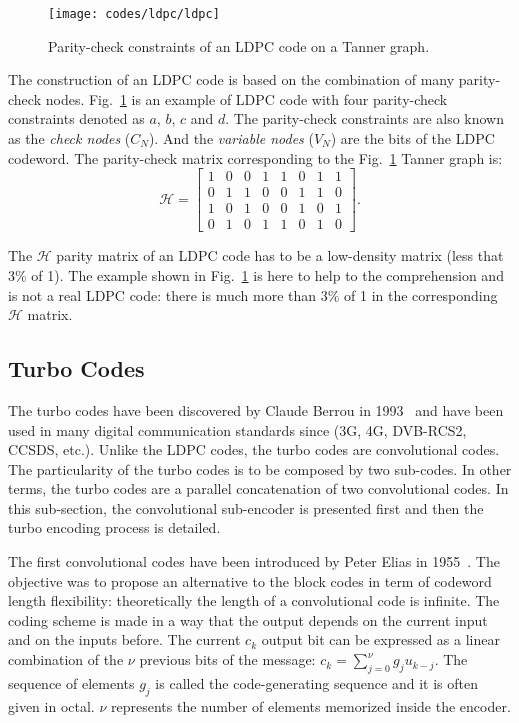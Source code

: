 \begin{figure}[htp]
  \centering
  \texttt{[image: codes/ldpc/ldpc]}
  \caption{Parity-check constraints of an LDPC code on a Tanner graph.}
  \label{fig:ctx_codes_ldpc}
\end{figure}

The construction of an LDPC code is based on the combination of many
parity-check nodes. Fig.~\ref{fig:ctx_codes_ldpc} is an example of LDPC code
with four parity-check constraints denoted as $a$, $b$, $c$ and $d$. The
parity-check constraints are also known as the \emph{check nodes} ($C_N$).
And the \emph{variable nodes} ($V_N$) are the bits of the LDPC codeword. The
parity-check matrix corresponding to the Fig.~\ref{fig:ctx_codes_ldpc} Tanner
graph is:
\begin{equation*}
\bm{\mathcal{H}} =
\begin{bmatrix}
  1 & 0 & 0 & 1 & 1 & 0 & 1 & 1\\
  0 & 1 & 1 & 0 & 0 & 1 & 1 & 0\\
  1 & 0 & 1 & 0 & 0 & 1 & 0 & 1\\
  0 & 1 & 0 & 1 & 1 & 0 & 1 & 0
\end{bmatrix}.
\end{equation*}

The $\bm{\mathcal{H}}$ parity matrix of an LDPC code has to be a low-density
matrix (less that 3\% of 1). The example shown in
Fig.~\ref{fig:ctx_codes_ldpc} is here to help to the comprehension and is not a
real LDPC code: there is much more than 3\% of 1 in the corresponding
$\bm{\mathcal{H}}$ matrix.

\subsection{Turbo Codes}

The turbo codes have been discovered by Claude Berrou in 1993~\cite{Berrou1993}
and have been used in many digital communication standards since (3G, 4G,
DVB-RCS2, CCSDS, etc.). Unlike the LDPC codes, the turbo codes are convolutional
codes. The particularity of the turbo codes is to be composed by two sub-codes.
In other terms, the turbo codes are a parallel concatenation of two convolutional
codes. In this sub-section, the convolutional sub-encoder is presented first and
then the turbo encoding process is detailed.

The first convolutional codes have been introduced by Peter Elias in
1955~\cite{Elias1955}. The objective was to propose an alternative to the block
codes in term of codeword length flexibility: theoretically the length of a
convolutional code is infinite. The coding scheme is made in a way that the
output depends on the current input and on the inputs before. The current $c_k$
output bit can be expressed as a linear combination of the $\nu$ previous bits
of the message: $c_k = \sum\limits_{j=0}^\nu g_ju_{k-j}$. The sequence of
elements $g_j$ is called the code-generating sequence and it is often given in
octal. $\nu$ represents the number of elements memorized inside the encoder.

